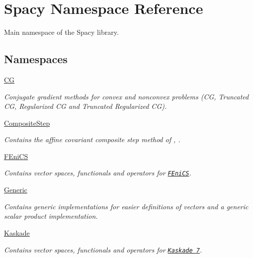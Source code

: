 \hypertarget{namespaceSpacy}{}\section{Spacy Namespace Reference}
\label{namespaceSpacy}


Main namespace of the Spacy library.  


\subsection*{Namespaces}
\begin{DoxyCompactItemize}
\item 
 \hyperlink{namespaceSpacy_1_1CG}{C\+G}
\begin{DoxyCompactList}\small\item\em Conjugate gradient methods for convex and nonconvex problems (C\+G, Truncated C\+G, Regularized C\+G and Truncated Regularized C\+G). \end{DoxyCompactList}\item 
 \hyperlink{namespaceSpacy_1_1CompositeStep}{Composite\+Step}
\begin{DoxyCompactList}\small\item\em Contains the affine covariant composite step method of \cite{Lubkoll2015}, \cite{Lubkoll2015a}. \end{DoxyCompactList}\item 
 \hyperlink{namespaceSpacy_1_1FEniCS}{F\+Eni\+C\+S}
\begin{DoxyCompactList}\small\item\em Contains vector spaces, functionals and operators for \href{www.fenicsproject.org}{\tt F\+Eni\+C\+S}. \end{DoxyCompactList}\item 
 \hyperlink{namespaceSpacy_1_1Generic}{Generic}
\begin{DoxyCompactList}\small\item\em Contains generic implementations for easier definitions of vectors and a generic scalar product implementation. \end{DoxyCompactList}\item 
 \hyperlink{namespaceSpacy_1_1Kaskade}{Kaskade}
\begin{DoxyCompactList}\small\item\em Contains vector spaces, functionals and operators for \href{http://www.zib.de/projects/kaskade7-finite-element-toolbox}{\tt Kaskade 7}. \end{DoxyCompactList}\item 

\end{DoxyCompactItemize}
